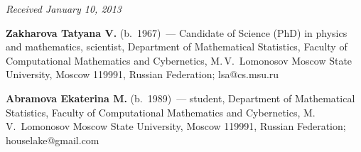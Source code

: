 \hfill{\small\textit{Received January 10, 2013}}

\Contr

\noindent
\textbf{Zakharova Tatyana V.} (b.\ 1967)~--- Candidate of Science (PhD) in physics and 
mathematics, scientist, Department of Mathematical Statistics, Faculty of 
Computational Mathematics and Cybernetics, M.\,V.~Lomonosov Moscow State 
University, Moscow 119991, Russian Federation; lsa@cs.msu.ru

\vspace*{3pt}

\noindent
\textbf{Abramova Ekaterina M.} (b.\ 1989)~--- student, Department of Mathematical 
Statistics, Faculty of Computational Mathematics and Cybernetics, 
M.\,V.~Lomonosov Moscow State University, Moscow 119991, Russian Federation; 
houselake@gmail.com

 \label{end\stat}
\renewcommand{\bibname}{\protect\rm Литература}
